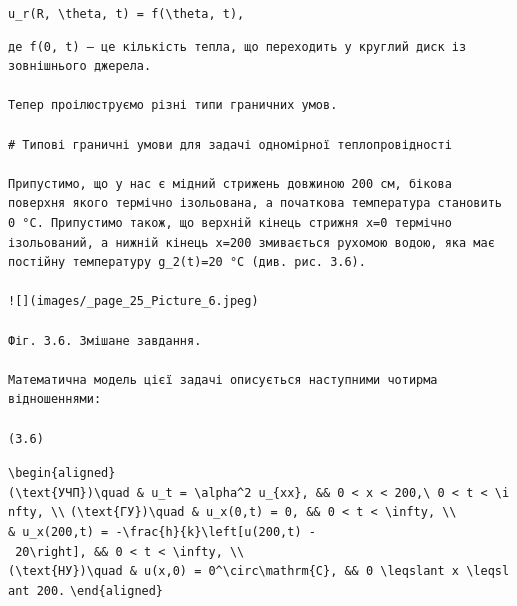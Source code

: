 \documentclass[
  ukrainian,
]{article}
\begin{document}
\texttt{u\_r(R,\ \textbackslash{}theta,\ t)\ =\ f(\textbackslash{}theta,\ t),}

\begin{verbatim}
де f(0, t) — це кількість тепла, що переходить у круглий диск із зовнішнього джерела.

Тепер проілюструємо різні типи граничних умов.

# Типові граничні умови для задачі одномірної теплопровідності

Припустимо, що у нас є мідний стрижень довжиною 200 см, бікова поверхня якого термічно ізольована, а початкова температура становить 0 °C. Припустимо також, що верхній кінець стрижня x=0 термічно ізольований, а нижній кінець x=200 змивається рухомою водою, яка має постійну температуру g_2(t)=20 °C (див. рис. 3.6).

![](images/_page_25_Picture_6.jpeg)

Фіг. 3.6. Змішане завдання.

Математична модель цієї задачі описується наступними чотирма відношеннями:

(3.6)
\end{verbatim}

\texttt{\textbackslash{}begin\{aligned\}}
\texttt{(\textbackslash{}text\{УЧП\})\textbackslash{}quad\ \&\ u\_t\ =\ \textbackslash{}alpha\^{}2\ u\_\{xx\},\ \&\&\ 0\ \textless{}\ x\ \textless{}\ 200,\textbackslash{}\ 0\ \textless{}\ t\ \textless{}\ \textbackslash{}infty,\ \textbackslash{}\textbackslash{}}
\texttt{(\textbackslash{}text\{ГУ\})\textbackslash{}quad\ \&\ u\_x(0,t)\ =\ 0,\ \&\&\ 0\ \textless{}\ t\ \textless{}\ \textbackslash{}infty,\ \textbackslash{}\textbackslash{}}
\texttt{\&\ u\_x(200,t)\ =\ -\textbackslash{}frac\{h\}\{k\}\textbackslash{}left{[}u(200,t)\ -\ 20\textbackslash{}right{]},\ \&\&\ 0\ \textless{}\ t\ \textless{}\ \textbackslash{}infty,\ \textbackslash{}\textbackslash{}}
\texttt{(\textbackslash{}text\{НУ\})\textbackslash{}quad\ \&\ u(x,0)\ =\ 0\^{}\textbackslash{}circ\textbackslash{}mathrm\{C\},\ \&\&\ 0\ \textbackslash{}leqslant\ x\ \textbackslash{}leqslant\ 200.}
\texttt{\textbackslash{}end\{aligned\}}
\end{document}
